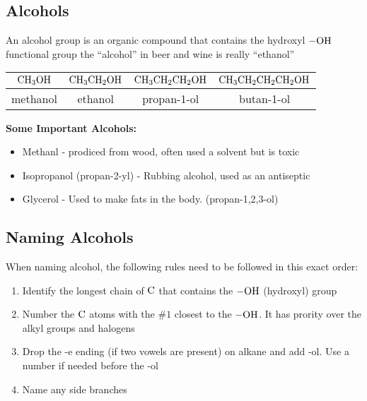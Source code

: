 \documentclass[12pt, a4paper]{article}
\begin{document}
    \subsection{Alcohols}

    An alcohol group is an organic compound that contains the hydroxyl $\ce{-OH}$ functional group
    the ``alcohol'' in beer and wine is really ``ethanol''

    \begin{center}
        \begin{tabular}{| c | c | c | c |}
            \hline
            $\ce{CH3OH}$ & $\ce{CH3CH2OH}$ & $\ce{CH3CH2CH2OH}$ & $\ce{CH3CH2CH2CH2OH}$\\
            \hline
            methanol & ethanol & propan-1-ol & butan-1-ol \\
            \hline
        \end{tabular}
    \end{center}

    \noindent\textbf{Some Important Alcohols:}
    \begin{itemize}
        \item Methanl - prodiced from wood, often used a solvent but is toxic
        \item Isopropanol (propan-2-yl) - Rubbing alcohol, used as an antiseptic
        \item Glycerol - Used to make fats in the body. (propan-1,2,3-ol)
    \end{itemize}

    \subsection{Naming Alcohols}

    When naming alcohol, the following rules need to be followed in this exact order:

    \begin{center}
        \begin{enumerate}
            \item Identify the longest chain of $\ce{C}$ that contains the $\ce{-OH}$ (hydroxyl) group
            \item Number the $\ce{C}$ atoms with the \#$1$ closest to the $\ce{-OH}$. It has prority over the alkyl 
                  groups and halogens
            \item Drop the -e ending (if two vowels are present) on alkane and add -ol. Use a number
                  if needed before the -ol
            \item Name any side branches %
    
        \end{enumerate}
    \end{center}
\end{document}
